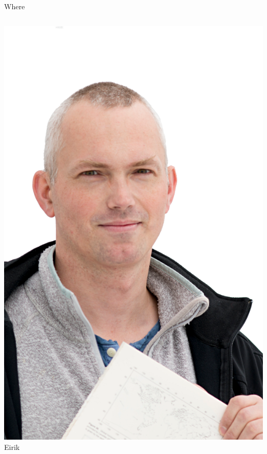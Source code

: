 \documentclass[12pt,table,t]{beamer}
\begin{document}
\begin{frame}{Where}
\begin{columns}[c]
    \begin{center}
      \includegraphics[width=\linewidth]{figure/eirik} \\
      Eirik
    \end{center}
  \end{columns}
\end{frame}
\end{document}
